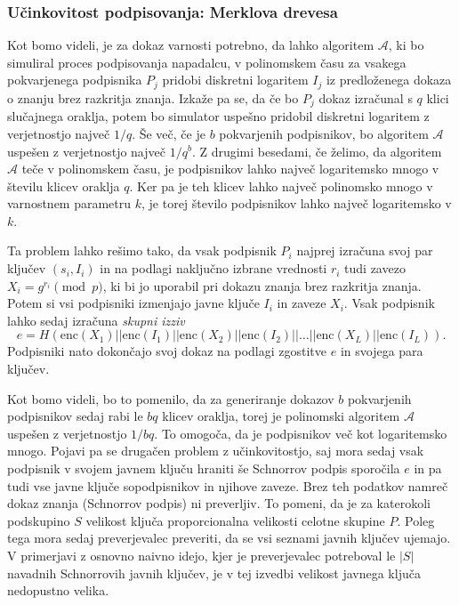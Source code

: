 \subsubsection{Učinkovitost podpisovanja: Merklova drevesa}
Kot bomo videli, je za dokaz varnosti potrebno, da lahko algoritem $\mathcal{A}$, ki bo simuliral
proces podpisovanja napadalcu, v polinomskem času za vsakega pokvarjenega podpisnika $P_j$ pridobi
diskretni logaritem $I_j$ iz predloženega dokaza o znanju brez razkritja znanja. Izkaže pa se, da če
bo $P_j$ dokaz izračunal s $q$ klici slučajnega oraklja, potem bo simulator uspešno pridobil diskretni
logaritem z verjetnostjo največ $1/q$. Še več, če je $b$ pokvarjenih podpisnikov, bo algoritem $\mathcal{A}$
uspešen z verjetnostjo največ $1/q^b$. Z drugimi besedami, če želimo, da algoritem $\mathcal{A}$ teče
v polinomskem času, je podpisnikov lahko največ logaritemsko mnogo v številu klicev oraklja $q$. Ker
pa je teh klicev lahko največ polinomsko mnogo v varnostnem parametru $k$, je torej število podpisnikov
lahko največ logaritemsko v $k$.

Ta problem lahko rešimo tako, da vsak podpisnik $P_i$ najprej izračuna svoj par ključev $(s_i, I_i)$
in na podlagi naključno izbrane vrednosti $r_i$ tudi zavezo $X_i = g^{r_i} \pmod p$, ki bi jo uporabil
pri dokazu znanja brez razkritja znanja. Potem si vsi podpisniki izmenjajo javne ključe $I_i$ in
zaveze $X_i$. Vsak podpisnik lahko sedaj izračuna \textit{skupni izziv}
$$
e = H(\text{enc}(X_1) || \text{enc}(I_1) || \text{enc}(X_2) || \text{enc}(I_2) || \dots || \text{enc}(X_L) || \text{enc}(I_L)).
$$
Podpisniki nato dokončajo svoj dokaz na podlagi zgostitve $e$ in svojega para ključev.

Kot bomo videli, bo to pomenilo, da za generiranje dokazov $b$ pokvarjenih podpisnikov sedaj rabi le
$bq$ klicev oraklja, torej je polinomski algoritem $\mathcal{A}$ uspešen z verjetnostjo $1/bq$. To
omogoča, da je podpisnikov več kot logaritemsko mnogo. Pojavi pa se drugačen problem z učinkovitostjo,
saj mora sedaj vsak podpisnik v svojem javnem ključu hraniti še Schnorrov podpis sporočila $e$ in pa
tudi vse javne ključe sopodpisnikov in njihove zaveze. Brez teh podatkov namreč dokaz znanja (Schnorrov
podpis) ni preverljiv. To pomeni, da je za katerokoli podskupino $S$ velikost ključa proporcionalna
velikosti celotne skupine $P$. Poleg tega mora sedaj preverjevalec preveriti, da se vsi seznami javnih
ključev ujemajo. V primerjavi z osnovno naivno idejo, kjer je preverjevalec potreboval le $|S|$ navadnih
Schnorrovih javnih ključev, je v tej izvedbi velikost javnega ključa nedopustno velika.


